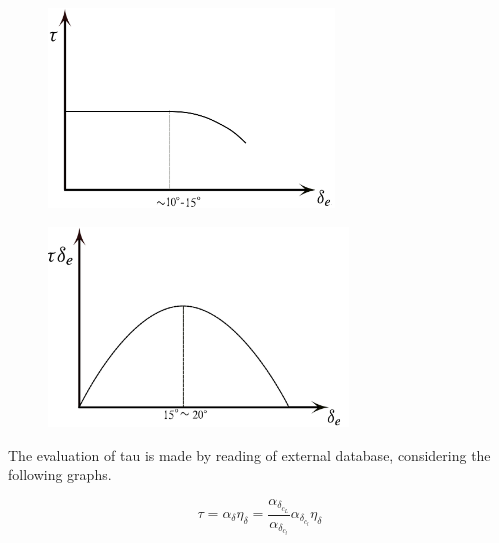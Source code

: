 \begin{figure}[H]
\centering
\begin{minipage}{.5\textwidth}
\centering
\includegraphics[height=5.3cm]{Immagini/taude.png}
\label{tau1}
\end{minipage}%
\begin{minipage}{.5\textwidth}
\centering
\includegraphics[height=5.3cm]{Immagini/taudeltae.png}
\label{tau2}
\end{minipage}
\label{fig:effects}
\end{figure}




		
The evaluation of tau is made by reading of external database, considering the following graphs.
	
\begin{equation}
\tau = \alpha_{\delta} \eta_{\delta} = \frac{\alpha_{{\delta}_{c_L}}}{\alpha_{{\delta}_{c_l}}}\alpha_{{\delta}_{c_l}} \eta_{\delta}
\end{equation}


